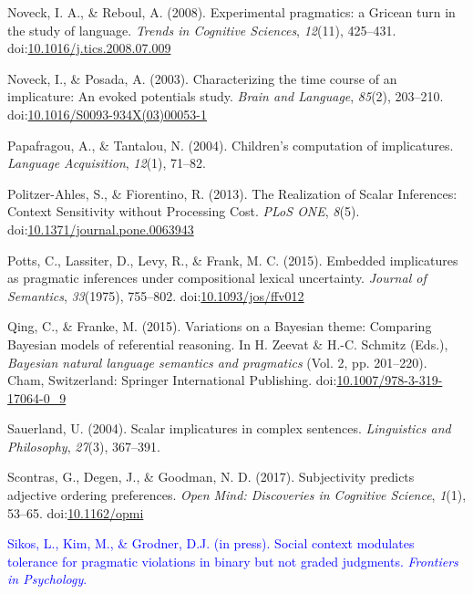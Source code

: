 \documentclass[man]{apa6}
\newcommand{\change}[1]{\textcolor{Blue}{#1}}
\theoremstyle{definition}
\theoremstyle{definition}
\theoremstyle{definition}
\theoremstyle{remark}
\begin{document}
\hypertarget{ref-noveck2008}{}
Noveck, I. A., \& Reboul, A. (2008). Experimental pragmatics: a Gricean
turn in the study of language. \emph{Trends in Cognitive Sciences},
\emph{12}(11), 425--431.
doi:\href{https://doi.org/10.1016/j.tics.2008.07.009}{10.1016/j.tics.2008.07.009}

\hypertarget{ref-Noveck2003}{}
Noveck, I., \& Posada, A. (2003). Characterizing the time course of an
implicature: An evoked potentials study. \emph{Brain and Language},
\emph{85}(2), 203--210.
doi:\href{https://doi.org/10.1016/S0093-934X(03)00053-1}{10.1016/S0093-934X(03)00053-1}

\hypertarget{ref-Papafragou2004}{}
Papafragou, A., \& Tantalou, N. (2004). Children's computation of
implicatures. \emph{Language Acquisition}, \emph{12}(1), 71--82.

\hypertarget{ref-Politzer-Ahles2013}{}
Politzer-Ahles, S., \& Fiorentino, R. (2013). The Realization of Scalar
Inferences: Context Sensitivity without Processing Cost. \emph{PLoS
ONE}, \emph{8}(5).
doi:\href{https://doi.org/10.1371/journal.pone.0063943}{10.1371/journal.pone.0063943}

\hypertarget{ref-Potts2015}{}
Potts, C., Lassiter, D., Levy, R., \& Frank, M. C. (2015). Embedded
implicatures as pragmatic inferences under compositional lexical
uncertainty. \emph{Journal of Semantics}, \emph{33}(1975), 755--802.
doi:\href{https://doi.org/10.1093/jos/ffv012}{10.1093/jos/ffv012}

\hypertarget{ref-Qing2015}{}
Qing, C., \& Franke, M. (2015). Variations on a Bayesian theme:
Comparing Bayesian models of referential reasoning. In H. Zeevat \&
H.-C. Schmitz (Eds.), \emph{Bayesian natural language semantics and
pragmatics} (Vol. 2, pp. 201--220). Cham, Switzerland: Springer
International Publishing.
doi:\href{https://doi.org/10.1007/978-3-319-17064-0_9}{10.1007/978-3-319-17064-0\_9}

\hypertarget{ref-sauerland2004scalar}{}
Sauerland, U. (2004). Scalar implicatures in complex sentences.
\emph{Linguistics and Philosophy}, \emph{27}(3), 367--391.

\hypertarget{ref-Scontras2017}{}
Scontras, G., Degen, J., \& Goodman, N. D. (2017). Subjectivity predicts
adjective ordering preferences. \emph{Open Mind: Discoveries in
Cognitive Science}, \emph{1}(1), 53--65.
doi:\href{https://doi.org/10.1162/opmi}{10.1162/opmi}

\change{\hypertarget{ref-Sikos2019}{}
Sikos, L., Kim, M., \& Grodner, D.J. (in press). Social context modulates tolerance for pragmatic violations in binary but not graded judgments. \emph{Frontiers in Psychology}.}
\end{document}
